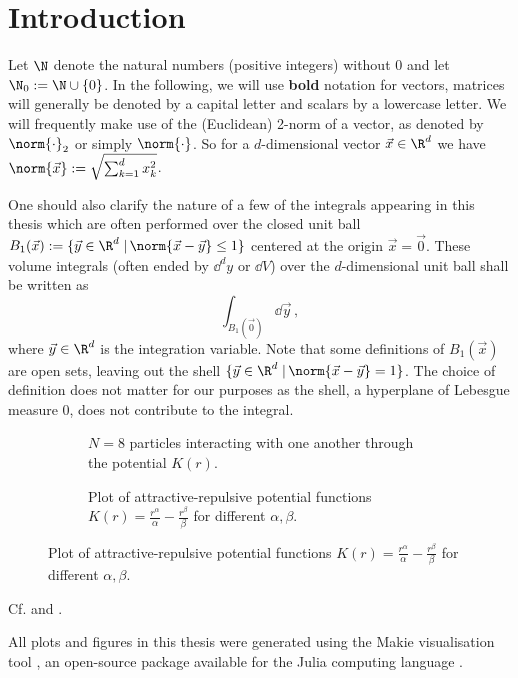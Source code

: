 \chapter{Introduction}
\label{chap:introduction}

Let $\N$ denote the natural numbers (positive integers) without $0$ and let $\N_0 := \N \cup \{0\}$.
In the following, we will use \textbf{bold} notation for vectors, matrices will generally be denoted by a capital letter and scalars by a lowercase letter.
We will frequently make use of the (Euclidean) 2-norm of a vector, as denoted by $\norm{\cdot}_2$ or simply $\norm{\cdot}$.
So for a $d$-dimensional vector $\vec{x} \in \R^d$ we have $\norm{\vec{x}} := \sqrt{\sum_{k=1}^d x_k^2}$.

One should also clarify the nature of a few of the integrals appearing in this thesis which are often performed over the closed unit ball $B_1(\vec{x}) := \{\vec{y} \in \R^d \;|\, \norm{\vec{x} - \vec{y}} \le 1\}$ centered at the origin $\vec{x} = \vec{0}$.
These volume integrals (often ended by $\dd^d y$ or $\dd V$) over the $d$-dimensional unit ball shall be written as
$$\int_{B_1(\vec{0})} \dd\vec{y}\,,$$
where $\vec{y} \in \R^d$ is the integration variable.
Note that some definitions of $B_1(\vec{x})$ are open sets, leaving out the shell $\{\vec{y} \in \R^d \;|\, \norm{\vec{x} - \vec{y}} = 1\}$.
The choice of definition does not matter for our purposes as the shell, a hyperplane of Lebesgue measure $0$, does not contribute to the integral.

\begin{figure}[H]
  \centering
  \begin{subfigure}[t]{0.5\textwidth}
    \centering
    \caption{$N = 8$ particles interacting with one another through the potential $K(r)$.}
    \label{fig:problem-setting}
  \end{subfigure}
  \hfill
  \begin{subfigure}[t]{0.49\textwidth}
    \centering
    \caption{Plot of attractive-repulsive potential functions $K(r) = \frac{r^\alpha}{\alpha} - \frac{r^\beta}{\beta}$ for different $\alpha, \beta$.}
    \label{fig:potential-function}
  \end{subfigure}
\end{figure}

Cf.  and .

All plots and figures in this thesis were generated using the Makie visualisation tool \parencite{2021-makie}, an open-source package available for the Julia computing language \parencite{2017-julia}.
